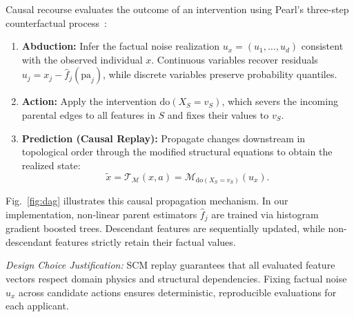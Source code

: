 \documentclass[nolineno]{paper/ieee-access/ieeeaccess}%
\newcommand{\SCM}{\ensuremath{\mathcal{M}}}
\newcommand{\Replay}{\ensuremath{\mathcal{T}_{\SCM}}}
\begin{document}
Causal recourse evaluates the outcome of an intervention using Pearl's three-step counterfactual process~\cite{pearl2009causality}:
\begin{enumerate}
\item \textbf{Abduction:} Infer the factual noise realization $u_x = (u_1, \dots, u_d)$ consistent with the observed individual $x$. Continuous variables recover residuals $u_j = x_j - \hat{f}_j(\mathrm{pa}_j)$, while discrete variables preserve probability quantiles.
\item \textbf{Action:} Apply the intervention $\mathrm{do}(X_S = v_S)$, which severs the incoming parental edges to all features in $S$ and fixes their values to $v_S$.
\item \textbf{Prediction (Causal Replay):} Propagate changes downstream in topological order through the modified structural equations to obtain the realized state:
\begin{equation}
  \widetilde{x} = \Replay(x, a) = \SCM_{\mathrm{do}(X_S = v_S)}(u_x).
  \label{eq:replay}
\end{equation}
\end{enumerate}

Fig.~\ref{fig:dag} illustrates this causal propagation mechanism. In our implementation, non-linear parent estimators $\hat{f}_j$ are trained via histogram gradient boosted trees. Descendant features are sequentially updated, while non-descendant features strictly retain their factual values.

\emph{Design Choice Justification:} SCM replay guarantees that all evaluated feature vectors respect domain physics and structural dependencies. Fixing factual noise $u_x$ across candidate actions ensures deterministic, reproducible evaluations for each applicant.
\end{document}
